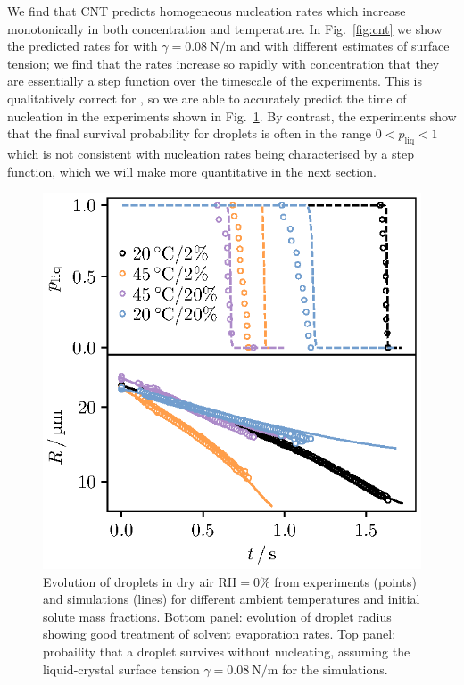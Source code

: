 \documentclass[11pt,twoside]{report}
\begin{document}
We find that CNT predicts homogeneous nucleation rates which increase monotonically in both concentration and temperature.
In Fig.\ \ref{fig:cnt} we show the predicted rates for  with $\gamma=\SI{0.08}{\newton\per\metre}$ and  with different estimates of surface tension; we find that the rates increase so rapidly with concentration that they are essentially a step function over the timescale of the experiments.
This is qualitatively correct for , so we are able to accurately predict the time of nucleation in the experiments shown in Fig.\ \ref{fig:nacl-trajectory}.
By contrast, the experiments show that the final survival probability for  droplets is often in the range $0 < p_\mathrm{liq} < 1$ which is not consistent with nucleation rates being characterised by a step function, which we will make more quantitative in the next section.

\begin{figure}
  \includegraphics[width=0.9\linewidth,outer]{nacl-trajectory}
  \caption[Evolution of  droplets: theory and experiments]{
    Evolution of  droplets in dry air $\mathrm{RH}=0\%$ from experiments (points) and simulations (lines) for different ambient temperatures and initial solute mass fractions.
    Bottom panel: evolution of droplet radius showing good treatment of solvent evaporation rates.
    Top panel: probaility that a droplet survives without nucleating, assuming the liquid-crystal surface tension $\gamma = \SI{0.08}{\newton\per\metre}$ \cite{DesarnaudJPCL2014} for the simulations.}
  \label{fig:nacl-trajectory}
\end{figure}
\end{document}
